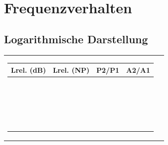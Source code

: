 \section{Frequenzverhalten }
\subsection{Logarithmische Darstellung }
\begin{tabular}{ll}
\parbox{7cm}{
	\scriptsize
	\begin{tabular}{|c|c|c|c|}
	\hline
	\textbf{Lrel. (dB)} & \textbf{Lrel. (NP)} & \textbf{P2/P1} & \textbf{A2/A1} \\ \hline
	$100.000$ & $11.513$ & $10^{10}$ & $10^5$ \\ \hline
	$90.000$ & $10.362$ & $10^9$ & $31622.777$ \\ \hline
	$80.000$ & $9.210$ & $10^8$ & $10^4$ \\ \hline
	$70.000$ & $8.059$ & $10^7$ & $3162.278$ \\ \hline
	$60.000$ & $6.908$ & $10^6$ & $10^3$ \\ \hline
	$50.000$ & $5.756$ & $10^5$ & $316.228$ \\ \hline
	$40.000$ & $4.605$ & $10^4$ & $10^2$ \\ \hline
	$30.000$ & $3.454$ & $10^3$ & $31.623$ \\ \hline
	\textbf{$20.000$} & $2.303$ & \textbf{$10^2$} & \textbf{$10.000$} \\ \hline
	$19.085$ & $2.197$ & $81.000$ & $9.000$ \\ \hline
	$19.000$ & $2.187$ & $79.433$ & $8.913$ \\ \hline
	$18.062$ & $2.079$ & $64.000$ & $8.000$ \\ \hline
	$18.000$ & $2.072$ & $63.096$ & $7.943$ \\ \hline
	$17.000$ & $1.957$ & $50.119$ & $7.079$ \\ \hline
	$16.902$ & $1.946$ & $49.000$ & $7.000$ \\ \hline
	$16.000$ & $1.842$ & $39.811$ & $6.310$ \\ \hline
	$15.563$ & $1.792$ & $36.000$ & $6.000$ \\ \hline
	$15.000$ & $1.727$ & $31.623$ & $5.623$ \\ \hline
	$14.000$ & $1.612$ & $25.119$ & $5.012$ \\ \hline
	\textbf{$13.979$} & $1.609$ & \textbf{$25.000$} & \textbf{$5.000$} \\ \hline
	$13.000$ & $1.497$ & $19.953$ & $4.467$ \\ \hline

\end{tabular}}
\end{tabular}
